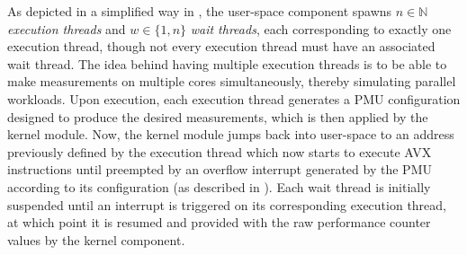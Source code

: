 As depicted in a simplified way in , the user-space component spawns $n\in\mathbb{N}$ \textit{execution threads} and $w\in\{1,n\}$ \textit{wait threads}, each corresponding to exactly one execution thread, though not every execution thread must have an associated wait thread. The idea behind having multiple execution threads is to be able to make measurements on multiple cores simultaneously, thereby simulating parallel workloads. Upon execution, each execution thread generates a \gls{PMU} configuration designed to produce the desired measurements, which is then applied by the kernel module. Now, the kernel module jumps back into user-space to an address previously defined by the execution thread which now starts to execute \gls{AVX} instructions until preempted by an overflow interrupt generated by the \gls{PMU} according to its configuration (as described in ). Each wait thread is initially suspended until an interrupt is triggered on its corresponding execution thread, at which point it is resumed and provided with the raw performance counter values by the kernel component.

